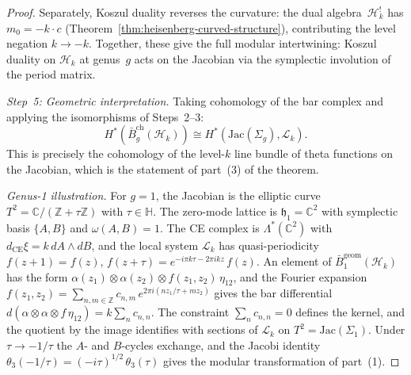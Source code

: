 \begin{proof}
Separately, Koszul duality reverses the curvature:
the dual algebra~$\mathcal{H}_k^!$ has $m_0 = -k \cdot c$
(Theorem~\ref{thm:heisenberg-curved-structure}), contributing
the level negation $k \to -k$.  Together, these give the full
modular intertwining: Koszul duality on $\mathcal{H}_k$ at
genus~$g$ acts on the Jacobian via the symplectic involution
of the period matrix.

\emph{Step~5: Geometric interpretation.}
Taking cohomology of the bar complex and applying the
isomorphisms of Steps~2--3:
\[
H^*(\bar{B}_g^{\mathrm{ch}}(\mathcal{H}_k))
\cong H^*(\mathrm{Jac}(\Sigma_g), \mathcal{L}_k).
\]
This is precisely the cohomology of the level-$k$ line bundle
of theta functions on the Jacobian, which is the statement of
part~(3) of the theorem.

\medskip
\emph{Genus-1 illustration.}
For $g = 1$, the Jacobian is the elliptic curve
$T^2 = \mathbb{C}/(\mathbb{Z} + \tau\mathbb{Z})$ with
$\tau \in \mathbb{H}$.
The zero-mode lattice is $\mathfrak{h}_1 = \mathbb{C}^2$
with symplectic basis $\{A, B\}$ and $\omega(A,B) = 1$.
The CE complex is $\Lambda^*(\mathbb{C}^2)$ with
$d_{\mathrm{CE}}\xi = k\, dA \wedge dB$, and the local
system $\mathcal{L}_k$ has quasi-periodicity
$f(z+1) = f(z)$,
$f(z + \tau) = e^{-i\pi k\tau - 2\pi i k z}\, f(z)$.
An element of $\bar{B}_1^{\mathrm{geom}}(\mathcal{H}_k)$ has
the form
$\alpha(z_1) \otimes \alpha(z_2) \otimes f(z_1,z_2)\,\eta_{12}$,
and the Fourier expansion
$f(z_1,z_2) = \sum_{n,m \in \mathbb{Z}}
  c_{n,m}\, e^{2\pi i(nz_1/\tau + mz_2)}$
gives the bar differential
$d(\alpha \otimes \alpha \otimes f\,\eta_{12})
= k \sum_n c_{n,n}$.
The constraint $\sum_n c_{n,n} = 0$ defines the kernel, and the
quotient by the image identifies with sections of $\mathcal{L}_k$
on $T^2 = \mathrm{Jac}(\Sigma_1)$.
Under $\tau \to -1/\tau$ the $A$- and $B$-cycles exchange,
and the Jacobi identity
$\theta_3(-1/\tau) = (-i\tau)^{1/2}\,\theta_3(\tau)$
gives the modular transformation of part~(1).
\end{proof}

